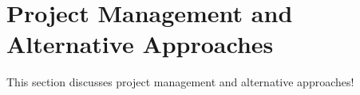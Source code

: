 \section{Project Management and Alternative Approaches\label{methedology:pivoting}}
This section discusses project management and alternative approaches!